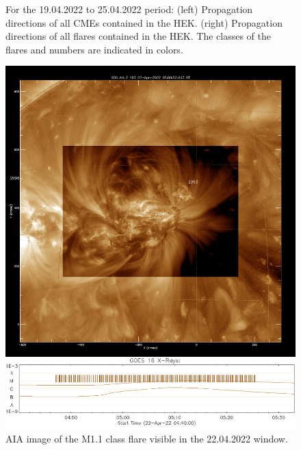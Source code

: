 \begin{figure}[H]
\begin{subfigure}{.47\textwidth}
        \end{subfigure}
        \caption{For the 19.04.2022 to 25.04.2022 period: (left) Propagation directions of all CMEs contained in the HEK. (right) Propagation directions of all flares contained in the HEK. The classes of the flares and numbers are indicated in colors.}
        \label{locator}
        \end{figure}

    \begin{figure}[H]
        \centering
        \includegraphics[width = 12cm]{report/Figures/results/aia_Mclass_2204.png}
        \caption{AIA image of the M1.1 class flare visible in the 22.04.2022 window.}
        \label{Mclass_flare}
    \end{figure}